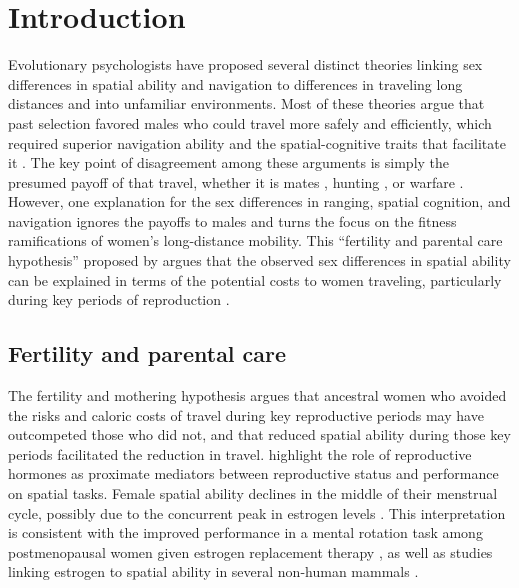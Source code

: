 \section{Introduction}
\label{sec:1}
Evolutionary psychologists have proposed several distinct theories linking sex differences in spatial ability and navigation to differences in traveling long distances and into unfamiliar environments.  Most of these theories argue that past selection favored males who could travel more safely and efficiently, which required superior navigation ability and the spatial-cognitive traits that facilitate it \citep{jones2003evolution}.  The key point of disagreement among these arguments is simply the presumed payoff of that travel, whether it is mates \citep{gaulin1992evolution}, hunting \citep{eals1994hunter}, or warfare \citep{geary1995sexual}.  However, one explanation for the sex differences in ranging, spatial cognition, and navigation ignores the payoffs to males and turns the focus on the fitness ramifications of women's long-distance mobility.  This ``fertility and parental care hypothesis'' proposed by \citet{sherry1997evolution} argues that the observed sex differences in spatial ability can be explained in terms of the potential costs to women traveling, particularly during key periods of reproduction \citep{ecuyer2004have}.

	\subsection{Fertility and parental care}
	\label{sec:1.1}
The fertility and mothering hypothesis argues that ancestral women who avoided the risks and caloric costs of travel during key reproductive periods may have outcompeted those who did not, and that reduced spatial ability during those key periods facilitated  the reduction in travel.  \citet{sherry1997evolution} highlight the role of reproductive hormones as proximate mediators between reproductive status and performance on spatial tasks. Female spatial ability declines in the middle of their menstrual cycle, possibly due to the concurrent peak in estrogen levels \citep{hampson1988reciprocal, hampson1990estrogen, mccormick2001menstrual, komnenich1978gonadal, hausmann2000sex}. This interpretation is consistent with the improved performance in a mental rotation task among postmenopausal women given estrogen replacement therapy \citep{duka2000effects}, as well as studies linking estrogen to spatial ability in several non-human mammals \citep{fugger1998sex, lacreuse1999spatial, frye1995estrus}.
	
